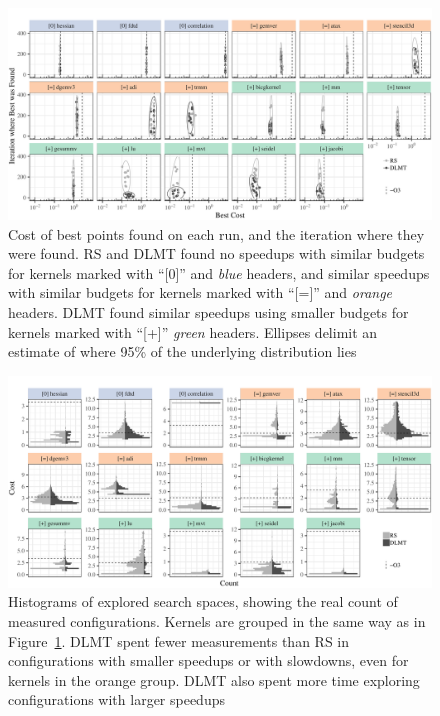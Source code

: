 \documentclass[conference]{IEEEtran}
\begin{document}
\begin{figure}[p]
\centering
\includegraphics[width=\textwidth]{./img/iteration_best_comparison.pdf}
\caption{\label{fig:org3d67ac2}
Cost of best points found on each run, and the iteration where they were found. RS and DLMT found no speedups with similar budgets for kernels marked with ``[0]'' and \emph{blue} headers, and similar speedups with similar budgets for kernels marked with ``[=]'' and \emph{orange} headers. DLMT found similar speedups using smaller budgets for kernels marked with ``[+]'' \emph{green} headers. Ellipses delimit an estimate of where 95\% of the underlying distribution lies}
\end{figure}

\begin{figure}[p]
\centering
\includegraphics[width=\textwidth]{./img/split_histograms.pdf}
\caption{\label{fig:org8675836}
Histograms of explored search spaces, showing the real count of measured configurations. Kernels are grouped in the same way as in Figure~\ref{fig:org3d67ac2}. DLMT spent fewer measurements than RS in configurations with smaller speedups or with slowdowns, even for kernels in the orange group. DLMT also spent more time exploring configurations with larger speedups}
\end{figure}
\end{document}
